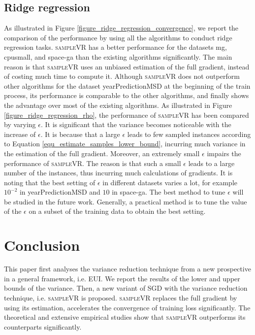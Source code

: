\documentclass[letterpaper]{article}
\begin{document}
\subsection{Ridge regression}
\label{sect_performance_evaluation_convergence}
As illustrated in Figure \ref{figure_ridge_regression_convergence}, we report the comparison of the performance by using all the algorithms to  conduct  ridge regression tasks. \textsc{sampleVR} has a better performance for the datasets mg, cpusmall, and space-ga than the existing algorithms significantly. The main reason is that \textsc{sampleVR} uses an unbiased estimation of the full gradient, instead of costing much time to compute it.  Although \textsc{sampleVR} does not outperform other algorithms for the dataset yearPredictionMSD at the beginning of the train process, its performance is comparable to the other algorithms, and finally shows the advantage over most of the existing algorithms.  As illustrated in Figure \ref{figure_ridge_regression_rho}, the performance of \textsc{sampleVR} has been compared by varying $\epsilon$. It is significant that the variance becomes noticeable with the increase of $\epsilon$. It is because that a large $\epsilon$ leads to few sampled instances  according to Equation \ref{equ_estimate_samples_lower_bound}, incurring much variance in the estimation of the full gradient. Moreover,  an extremely small  $\epsilon$  impairs  the performance of \textsc{sampleVR}. The reason is that such a small $\epsilon$ leads to a large number of the instances, thus incurring  much calculations of gradients.   It is noting that the best setting of $\epsilon$  in different datasets varies a lot, for example $10^{-2}$ in yearPredictionMSD and $10$ in space-ga. The best method to tune $\epsilon$ will be studied in the future work. Generally, a practical method  is to  tune the value of the $\epsilon$ on a subset of the training data to obtain the best setting.



\section{Conclusion}
\label{sect_conclusion}
This paper first analyses the  variance reduction technique   from a new prospective in a general framework, i.e. EUI. We report the results of the lower and upper bounds of the variance. Then, a new variant of SGD with the variance reduction technique, i.e. \textsc{sampleVR} is proposed. \textsc{sampleVR} replaces the full gradient by using its estimation, accelerates the convergence of training loss significantly. The theoretical and  extensive empirical studies show that  \textsc{sampleVR} outperforms its counterparts significantly.



\end{document}
